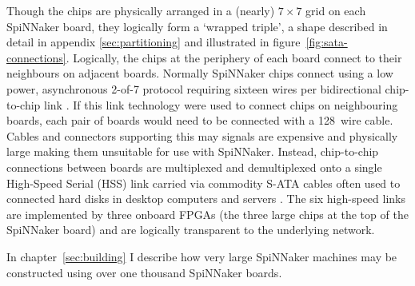 		Though the chips are physically arranged in a (nearly) $7\times7$ grid on
		each SpiNNaker board, they logically form a `wrapped triple', a shape
		described in detail in appendix \ref{sec:partitioning} and illustrated in
		figure~\ref{fig:sata-connections}. Logically, the chips at the periphery of
		each board connect to their neighbours on adjacent boards. Normally
		SpiNNaker chips connect using a low power, asynchronous 2-of-7 protocol
		requiring sixteen wires per bidirectional chip-to-chip link
		\cite{bainbridge03}. If this link technology were used to connect chips on
		neighbouring boards, each pair of boards would need to be connected with a
		128~wire cable. Cables and connectors supporting this may signals are
		expensive and physically large making them unsuitable for use with
		SpiNNaker. Instead, chip-to-chip connections between boards are multiplexed
		and demultiplexed onto a single High-Speed Serial (HSS) link
		\cite{athavale05} carried via commodity S-ATA cables often used to
		connected hard disks in desktop computers and servers \cite{sata3spec}.
		The six high-speed links are implemented by three onboard FPGAs (the three
		large chips at the top of the SpiNNaker board) and are logically
		transparent to the underlying network.
		
		In chapter~\ref{sec:building} I describe how very large SpiNNaker machines
		may be constructed using over one thousand SpiNNaker boards.
